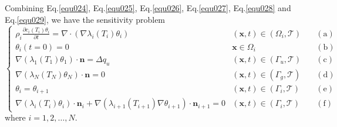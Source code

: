 \documentclass[UTF-8]{article}
\begin{document}
Combining Eq.\ref{equ024}, Eq.\ref{equ025}, Eq.\ref{equ026}, Eq.\ref{equ027}, Eq.\ref{equ028} and Eq.\ref{equ029}, we have the sensitivity problem
\begin{equation}\label{equ030}
	\left\{
	\begin{array}{lll}
		\rho_i \frac{\partial c_i(T_i)\theta_i}{\partial t} = \nabla \cdot \left( \nabla \lambda_i(T_i) \theta_i \right) \quad &(\pmb{x},t) \in (\Omega_i,\mathcal{T}) \quad &(\text{a}) \\
		\theta_i(t = 0) = 0 & \pmb{x} \in \Omega_i &(\text{b})\\
		\nabla \left( \lambda_1(T_1)\theta_1 \right) \cdot \pmb{n} = \Delta q_u & (\pmb{x},t) \in (\Gamma_u,\mathcal{T}) &(\text{c})\\
		\nabla \left( \lambda_N(T_N)\theta_N \right) \cdot \pmb{n} = 0 & (\pmb{x},t) \in (\Gamma_g,\mathcal{T}) &(\text{d})\\
		\theta_i = \theta_{i+1} & (\pmb{x},t) \in (\Gamma_i,\mathcal{T}) &(\text{e})\\
		\nabla(\lambda_i(T_i)\theta_i) \cdot \pmb{n}_i + \nabla(\lambda_{i+1}(T_{i+1})\nabla\theta_{i+1}) \cdot \pmb{n}_{i+1} = 0 & (\pmb{x},t) \in (\Gamma_i,\mathcal{T}) &(\text{f})
	\end{array}
	\right.
\end{equation}
where $i = 1,2,\dots,N$.
\end{document}
